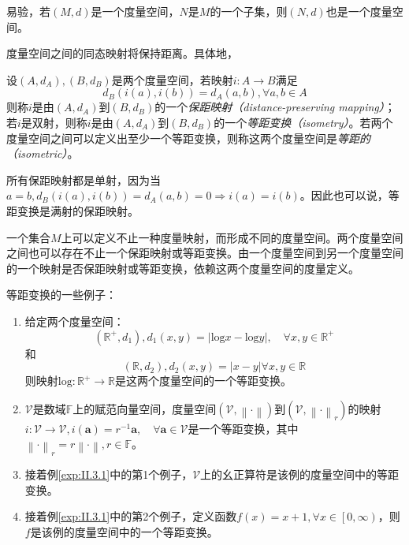 \documentclass[main.tex]{subfiles}
\begin{document}
易验，若$\left(M,d\right)$是一个度量空间，$N$是$M$的一个子集，则$\left(N,d\right)$也是一个度量空间。

度量空间之间的同态映射将保持距离。具体地，

\begin{definition}[等距变换]\label{def:II.3.2}
    设$\left(A,d_A\right),\left(B,d_B\right)$是两个度量空间，若映射$i:A\rightarrow B$满足
    \[d_B\left(i\left(a\right),i\left(b\right)\right)=d_A\left(a,b\right),\forall a,b\in A\]
    则称$i$是由$\left(A,d_A\right)$到$\left(B,d_B\right)$的一个\emph{保距映射（distance-preserving mapping）}；若$i$是双射，则称$i$是由$\left(A,d_A\right)$到$\left(B,d_B\right)$的一个\emph{等距变换（isometry）}。若两个度量空间之间可以定义出至少一个等距变换，则称这两个度量空间是\emph{等距的（isometric）}。
\end{definition}

所有保距映射都是单射，因为当$a=b,d_B\left(i\left(a\right),i\left(b\right)\right)=d_A\left(a,b\right)=0\Rightarrow i\left(a\right)=i\left(b\right)$。因此也可以说，等距变换是满射的保距映射。

一个集合$M$上可以定义不止一种度量映射，而形成不同的度量空间。两个度量空间之间也可以存在不止一个保距映射或等距变换。由一个度量空间到另一个度量空间的一个映射是否保距映射或等距变换，依赖这两个度量空间的度量定义。

\begin{example}\label{exp:II.3.2}
    等距变换的一些例子：
    \begin{enumerate}
        \item 给定两个度量空间：
              \[\left(\mathbb{R}^+,d_1\right),d_1\left(x,y\right)=\left|\mathrm{log}x-\mathrm{log}y\right|,\quad\forall x,y\in\mathbb{R}^+\]
              和
              \[\left(\mathbb{R},d_2\right),d_2\left(x,y\right)=\left|x-y\right|\forall x,y\in\mathbb{R}\]
              则映射$\mathrm{log}:\mathbb{R}^+\rightarrow\mathbb{R}$是这两个度量空间的一个等距变换。
        \item $\mathcal{V}$是数域$\mathbb{F}$上的赋范向量空间，度量空间$\left(\mathcal{V},\left\|\cdot\right\|\right)$到$\left(\mathcal{V},\left\|\cdot\right\|_r\right)$的映射$i:\mathcal{V}\rightarrow\mathcal{V},i\left(\mathbf{a}\right)=r^{-1}\mathbf{a},\quad\forall\mathbf{a}\in\mathcal{V}$是一个等距变换，其中$\left\|\cdot\right\|_r=r\left\|\cdot\right\|,r\in\mathbb{F}$。
        \item 接着例\ref{exp:II.3.1}中的第1个例子，$\mathcal{V}$上的幺正算符是该例的度量空间中的等距变换。
        \item 接着例\ref{exp:II.3.1}中的第2个例子，定义函数$f\left(x\right)=x+1,\forall x\in\left[0,\infty\right)$，则$f$是该例的度量空间中的一个等距变换。
    \end{enumerate}
\end{example}
\end{document}
